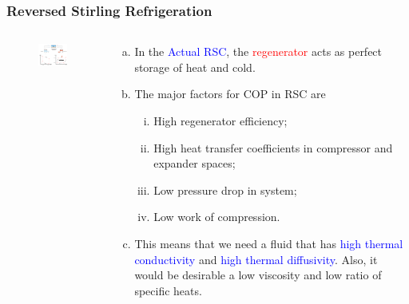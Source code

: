 \documentclass[10pt,compress]{beamer}
\begin{document}
\begin{frame}
 \frametitle{Reversed Stirling Refrigeration}
  \begin{columns}

   \begin{column}[c]{0.55\linewidth}
    \begin{figure}%
     \begin{center}
      \includegraphics[width=6.8cm,height=6.cm]{./Pics/Overview_Refrig9}
     \end{center}
    \end{figure}  
   \end{column}  

   \begin{column}[c]{0.45\linewidth}
    \begin{enumerate}[(a)]
     \item <1-> In the \textcolor{blue}{Actual RSC}, the \textcolor{red}{regenerator} acts as perfect storage of heat and cold. 
     \item <2-> The major factors for COP in RSC are
       \begin{enumerate}[(i)]
        \item <3-> High regenerator efficiency;
        \item <4-> High heat transfer coefficients in compressor and expander spaces;
        \item <5-> Low pressure drop in system;
        \item <6-> Low work of compression.
       \end{enumerate}
     \item <7->This means that we need a fluid that has \textcolor{blue}{high thermal conductivity} and \textcolor{blue}{high thermal diffusivity}. Also, it would be desirable a low viscosity and low ratio of specific heats.
    \end{enumerate}
   \end{column}

  \end{columns}
\end{frame}
\end{document}
